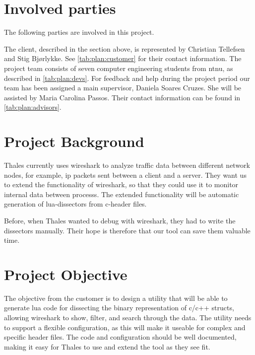 \section{Involved parties}
The following parties are involved in this project.

The client, described in the section above, is represented by Christian Tellefsen and Stig Bjørlykke. See \autoref{tab:plan:customer} for their contact information.
The project team consists of seven computer engineering students from \Gls{ntnu}, as described in \autoref{tab:plan:devs}.
For feedback and help during the project period our team has been assigned a main supervisor, Daniela Soares Cruzes.
She will be assisted by Maria Carolina Passos. Their contact information can be found in \autoref{tab:plan:advisors}.

\section{Project Background}
Thales currently uses \Gls{wireshark} to analyze traffic data between different network nodes, for example, \Gls{ip} \glspl{packet} sent between a client and a server.
They want us to extend the functionality of \Gls{wireshark}, so that they could use it to monitor internal data between \glspl{process}. The extended functionality will be automatic generation of \Gls{lua}-\glspl{dissector} from \Gls{c}-\gls{header} files.

Before, when Thales wanted to debug with \Gls{wireshark}, they had to write the \glspl{dissector} manually. Their hope is therefore that our tool can save them valuable time.

\section{Project Objective}
The objective from the customer is to design a \gls{utility} that will be able to generate \Gls{lua} code for dissecting the \gls{binary} representation of \Gls{c}/\Gls{c++} \glspl{struct}, allowing \Gls{wireshark} to show, filter, and search through the data.
 The \gls{utility} needs to support a flexible configuration, as this will make it useable for complex and specific \gls{header} files. 
The code and configuration should be well documented, making it easy for Thales to use and extend the tool as they see fit.

